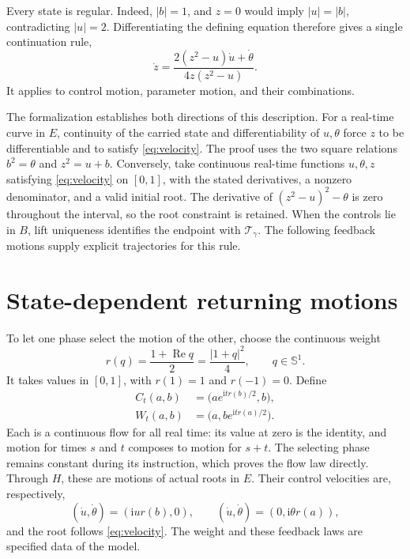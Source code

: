 \documentclass[11pt]{article}
\newcommand{\Sone}{\mathbb S^1}
\newcommand{\T}{\mathcal T}
\begin{document}
Every state is regular. Indeed, $|b|=1$, and $z=0$ would imply
$|u|=|b|$, contradicting $|u|=2$. Differentiating the defining equation
therefore gives a single continuation rule,
\begin{equation}\label{eq:velocity}
 \dot z=\frac{2(z^2-u)\dot u+\dot\theta}{4z(z^2-u)}.
\end{equation}
It applies to control motion, parameter motion, and their combinations.

The formalization establishes both directions of this description. For a
real-time curve in $E$, continuity of the carried state and differentiability
of $u,\theta$ force $z$ to be differentiable and to satisfy
\eqref{eq:velocity}. The proof uses the two square relations
$b^2=\theta$ and $z^2=u+b$. Conversely, take continuous real-time functions
$u,\theta,z$ satisfying \eqref{eq:velocity} on $[0,1]$, with the stated
derivatives, a nonzero denominator, and a valid initial root. The derivative
of $(z^2-u)^2-\theta$ is zero throughout the interval, so the root constraint
is retained. When the controls lie in $B$, lift uniqueness identifies the
endpoint with $\T_\gamma$. The following feedback motions supply explicit
trajectories for this rule.

\section{State-dependent returning motions}

To let one phase select the motion of the other, choose the continuous weight
\[
 r(q)=\frac{1+\operatorname{Re}q}{2}
     =\frac{|1+q|^2}{4},\qquad q\in\Sone.
\]
It takes values in $[0,1]$, with $r(1)=1$ and $r(-1)=0$. Define
\begin{align}
 C_t(a,b)&=\bigl(ae^{\mathrm i t r(b)/2},b\bigr),\label{eq:C}\\
 W_t(a,b)&=\bigl(a,be^{\mathrm i t r(a)/2}\bigr).\label{eq:W}
\end{align}
Each is a continuous flow for all real time: its value at zero is the
identity, and motion for times $s$ and $t$ composes to motion for $s+t$.
The selecting phase remains constant during its instruction, which proves
the flow law directly. Through $H$, these are motions of actual roots in
$E$. Their control velocities are, respectively,
\[
 (\dot u,\dot\theta)=(\mathrm i u r(b),0),
 \qquad (\dot u,\dot\theta)=(0,\mathrm i\theta r(a)),
\]
and the root follows \eqref{eq:velocity}. The weight and these feedback laws
are specified data of the model.
\end{document}
